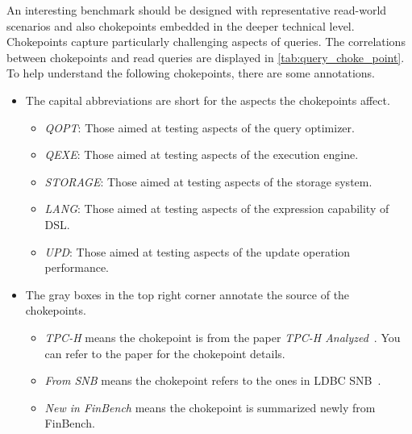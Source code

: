 An interesting benchmark should be designed with representative read-world
scenarios and also chokepoints embedded in the deeper technical level.
Chokepoints capture particularly challenging aspects of queries. The
correlations between chokepoints and read queries are displayed in
\autoref{tab:query_choke_point}. To help understand the following chokepoints,
there are some annotations.
\begin{itemize}
    \item The capital abbreviations are short for the aspects the chokepoints
          affect. \begin{itemize}
              \item \emph{QOPT}: Those aimed at testing aspects of the query
                    optimizer.
              \item \emph{QEXE}: Those aimed at testing aspects of the execution
                    engine.
              \item \emph{STORAGE}: Those aimed at testing aspects of the
                    storage system.
              \item \emph{LANG}: Those aimed at testing aspects of the
                    expression capability of DSL.
              \item \emph{UPD}: Those aimed at testing aspects of the update
                    operation performance.
          \end{itemize}
    \item The gray boxes in the top right corner annotate the source of the
          chokepoints. \begin{itemize}
              \item \emph{TPC-H} means the chokepoint is from the paper
                    \emph{TPC-H Analyzed}~\cite{DBLP:conf/tpctc/BonczNE13}. You can
                    refer to the paper for the chokepoint details.
              \item \emph{From SNB} means the chokepoint refers to the ones in
                    LDBC SNB~\cite{ldbc_snb_docs}.
              \item \emph{New in FinBench} means the chokepoint is summarized
                    newly from FinBench.
          \end{itemize}
\end{itemize}


{
\setlength{\tabcolsep}{.05em}

}

